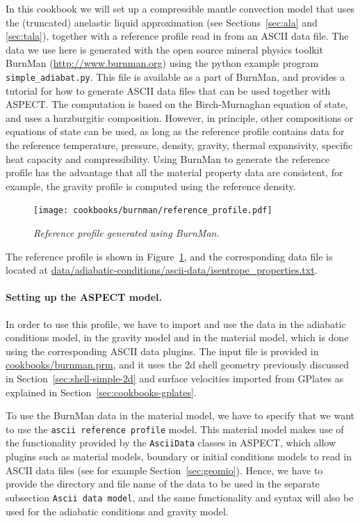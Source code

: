 \documentclass{article}
\newcommand{\aspect}{\textsc{ASPECT}}
\begin{document}
In this cookbook we will set up a compressible mantle convection model that uses 
the (truncated) anelastic liquid approximation (see Sections~\ref{sec:ala} and 
\ref{sec:tala}), together with a reference profile read in from an ASCII data file.
The data we use here is generated with the open source mineral physics toolkit BurnMan 
(\url{http://www.burnman.org}) using the python example program \texttt{simple\_adiabat.py}. 
This file is available as a part of BurnMan, and provides a tutorial for how to generate 
ASCII data files that can be used together with \aspect{}. 
The computation is based on the Birch-Murnaghan equation of state, and uses a harzburgitic 
composition. However, in principle, other compositions or equations of state can be used, 
as long as the reference profile contains data for the reference temperature, pressure, density, 
gravity, thermal expansivity, specific heat capacity and compressibility. Using BurnMan 
to generate the reference profile has the advantage that all the material property data 
are consistent, for example, the gravity profile is computed using the reference density.
\begin{figure}
  \texttt{[image: cookbooks/burnman/reference\_profile.pdf]}
  \caption{\it Reference profile generated using BurnMan.}
  \label{fig:burnman-reference-profile}
\end{figure}
The reference profile is shown in Figure~\ref{fig:burnman-reference-profile}, and the corresponding data file 
is located at \url{data/adiabatic-conditions/ascii-data/isentrope_properties.txt}.

\paragraph{Setting up the \aspect{} model.}
In order to use this profile, we have to import and use the data in the adiabatic conditions 
model, in the gravity model and in the material model, which is done using the corresponding 
ASCII data plugins. The input file is provided in \url{cookbooks/burnman.prm}, and it uses the 
2d shell geometry previously discussed in Section~\ref{sec:shell-simple-2d} and surface velocities
imported from GPlates as explained in Section~\ref{sec:cookbooks-gplates}.

To use the BurnMan data in the material model, we have to specify that we want to use the 
\texttt{ascii reference profile} model. This material model makes use of the functionality provided by
the \texttt{AsciiData} classes in \aspect{}, which allow plugins such as material models, 
boundary or initial conditions models to read in ASCII data files (see for example Section~\ref{sec:geomio}). 
Hence, we have to provide the directory and file name of the data to be used in the separate subsection 
\texttt{Ascii data model}, and the same functionality and syntax will also be used for the 
adiabatic conditions and gravity model.
\end{document}
